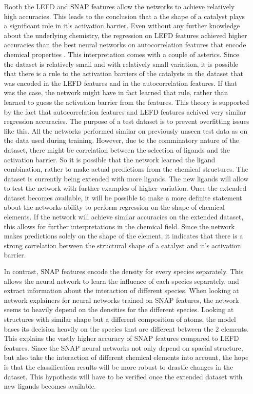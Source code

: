 Booth the LEFD and SNAP features allow the networks to achieve relatively high accuracies.
This leads to the conclusion that a the shape of a catalyst plays a significant role in it's activation barrier.
Even without any further knowledge about the underlying chemistry, the regression on LEFD features achieved higher accuracies than
the best neural networks on autocorrelation features that encode chemical properties \cite{friederich_dos}.
This interpretation comes with a couple of asterics.
Since the dataset is relatively small and with relatively small variation, it is possible that there is a rule
to the activation barriers of the catalysts in the dataset that was encoded in the LEFD features and in the autocorrelation features. 
If that was the case, the network might have in fact learned that rule, rather than learned to 
guess the activation barrier from the features.
This theory is supported by the fact that autocorrelation features and LEFD features achived very similar regression accuracies.
The purpose of a test dataset is to prevent overfitting issues like this.
All the networks performed similar on previously unseen test data as on the data used during training.
However, due to the comminatory nature of the dataset, there might be correlation 
between the selection of ligands and the activation barrier.
So it is possible that the network learned the ligand combination, rather to make actual predictions from the chemical structures.
The dataset is currently being extended with more ligands.
The new ligands will allow to test the network with further examples of higher variation.
Once the extended dataset becomes available, it will be possible to make a more definite statement about the networks ability to 
perform regression on the shape of chemical elements.
If the network will achieve similar accuracies on the extended dataset, this allows for further interpretations in the chemical field.
Since the network makes predictions solely on the shape of the element, it indicates that there is a strong
correlation between the structural shape of a catalyst and it's activation barrier.

In contrast, SNAP features encode the density for every species separately.
This allows the neural network to learn the influence of each species separately, and extract information about the interaction of different species.
When looking at network explainers for neural networks trained on SNAP features, the network seems to
heavily depend on the densities for the different species.
Looking at structures with similar shape but a different composition of atoms, the model bases 
its decision heavily on the species that are different between the 2 elements. %
This explains the vastly higher accuracy of SNAP features compared to LEFD features.
Since the SNAP neural networks not only depend on spacial structure, but also take the interaction of different chemical 
elements into account, the hope is that the classification results will be more robust to drastic changes in the dataset.
This hypothesis will have to be verified once the extended dataset with new ligands becomes available.

